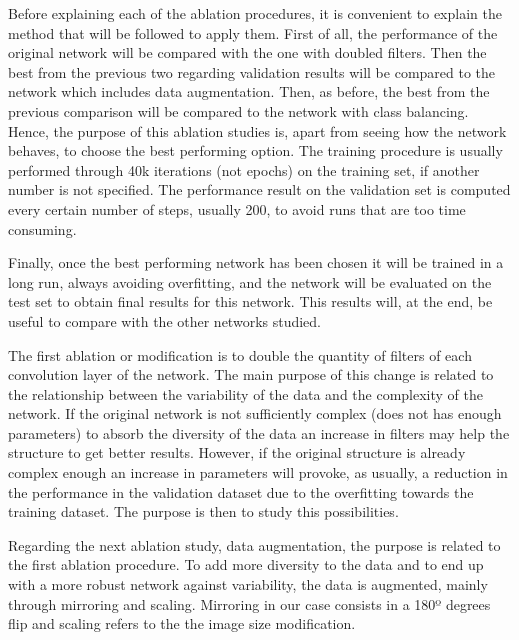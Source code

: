 Before explaining each of the ablation procedures, it is convenient to explain the method that will be followed to apply them. First of all, the performance of the original network will be compared with the one with doubled filters. Then the best from the previous two regarding validation results will be compared to the network which includes data augmentation. Then, as before, the best from the previous comparison will be compared to the network with class balancing. Hence, the purpose of this ablation studies is, apart from seeing how the network behaves, to choose the best performing option. The training procedure is usually performed through 40k iterations (not epochs) on the training set, if another number is not specified. The performance result on the validation set is computed every certain  number of steps, usually 200, to avoid runs that are too time consuming. \newline

Finally, once the best performing network has been chosen it will be trained in a long run, always avoiding overfitting, and the network will be evaluated on the test set to obtain final results for this network. This results will, at the end, be useful to compare with the other networks studied.\newline

The first ablation or modification is to double the quantity of filters of each convolution layer of the network. The main purpose of this change is related to the relationship between the variability of the data and the complexity of the network. If the original network is not sufficiently complex (does not has enough parameters) to absorb the diversity of the data an increase in filters may help the structure to get  better results. However, if the original structure is already complex enough an increase in parameters will provoke, as usually, a reduction in the performance in the validation dataset due to the overfitting towards the training dataset. The purpose is then to study this possibilities.\newline

Regarding the next ablation study, data augmentation, the purpose is related to the first ablation procedure. To add more diversity to the data and to end up with a more robust network against variability, the data is augmented, mainly through mirroring and scaling. Mirroring in our case consists in a 180º degrees flip and scaling refers to the the image size modification. \newline

